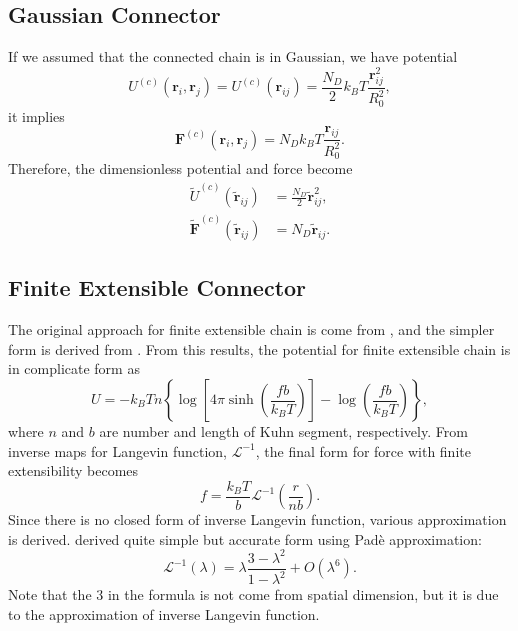 \documentclass[10pt, a4paper]{report}
\begin{document}
\subsection{Gaussian Connector}
If we assumed that the connected chain is in Gaussian, we have potential 
\begin{equation}
U^{(c)}(\mathbf{r}_i, \mathbf{r}_j) = U^{(c)}(\mathbf{r}_{ij}) = \frac{N_D}{2}k_BT\frac{\mathbf{r}_{ij}^2}{R_0^2},
\end{equation}
it implies 
\begin{equation}
\mathbf{F}^{(c)}(\mathbf{r}_i, \mathbf{r}_j) = N_Dk_BT\frac{\mathbf{r}_{ij}}{R_0^2}.
\end{equation}
Therefore, the dimensionless potential and force become
\begin{align}
  \tilde{U}^{(c)}(\tilde{\mathbf{r}}_{ij}) &= \frac{N_D}{2}\tilde{\mathbf{r}}_{ij}^2,\\
  \tilde{\mathbf{F}}^{(c)}(\tilde{\mathbf{r}}_{ij}) &= N_D\tilde{\mathbf{r}}_{ij}.
\end{align}

\subsection{Finite Extensible Connector}
The original approach for finite extensible chain is come from \textcite{Kuhn1942}, and the simpler form is derived from \textcite{James1943}. From this results, the potential for finite extensible chain is in complicate form as \parencite{treloar1975physics}
\begin{equation}
U=-k_BTn\left\{\log\left[4\pi\sinh\left(\frac{fb}{k_BT}\right)\right]-\log\left(\frac{fb}{k_BT}\right)\right\},
\end{equation}
where $n$ and $b$ are number and length of Kuhn segment, respectively.
From inverse maps for Langevin function, $\mathscr{L}^{-1}$, the final form for force with finite extensibility becomes
\begin{equation}
  f = \frac{k_BT}{b}\mathscr{L}^{-1}\left(\frac{r}{nb}\right).
\end{equation}
Since there is no closed form of inverse Langevin function, various approximation is derived. \textcite{Cohen1991} derived quite simple but accurate form using Pad\`e approximation:
\begin{equation}
  \mathscr{L}^{-1}(\lambda) = \lambda\frac{3 - \lambda^2}{1-\lambda^2} + O(\lambda^6).
\end{equation}
Note that the $3$ in the formula is not come from spatial dimension, but it is due to the approximation of inverse Langevin function.
\end{document}
